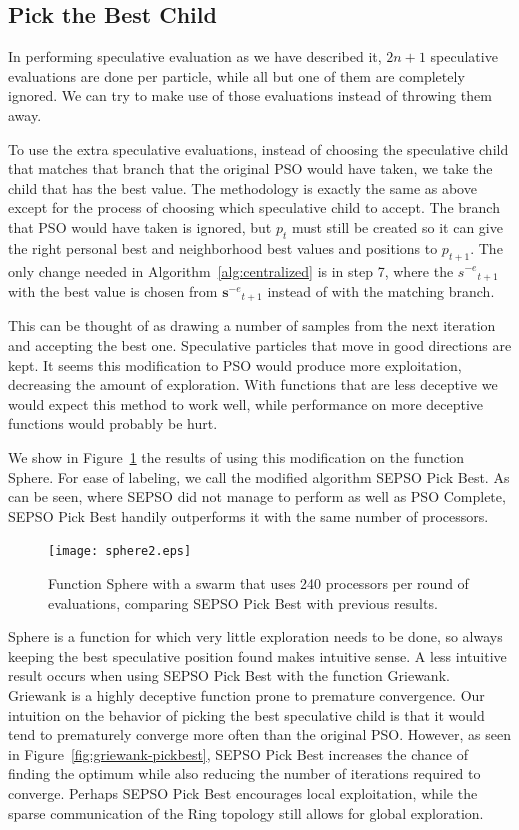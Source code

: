 \documentclass[journal,letterpaper]{IEEEtran}
\newcommand{\fig}[1]{Figure~\ref{fig:#1}}
\newcommand{\alg}[1]{Algorithm~\ref{alg:#1}}
\providecommand{\noeval}[1]{\ensuremath{#1^{-e}}}
\providecommand{\p}{\ensuremath{p}}
\providecommand{\s}{\ensuremath{s}}
\providecommand{\sset}{\ensuremath{\mathbf{s}}}
\begin{document}
\subsection{Pick the Best Child}
\label{sec:pickbest}

In performing speculative evaluation as we have described it, $2n+1$
speculative evaluations are done per particle, while all but one of them are
completely ignored.  We can try to make use of those evaluations instead of
throwing them away.  

To use the extra speculative evaluations, instead of choosing the speculative
child that matches that branch that the original PSO would have taken, we take
the child that has the best value.  The methodology is exactly the same as
above except for the process of choosing which speculative child to accept.
The branch that PSO would have taken is ignored, but $\p_t$ must still be
created so it can give the right personal best and neighborhood best values and
positions to $\p_{t+1}$.  The only change needed in \alg{centralized} is in
step 7, where the $\noeval{\s}_{t+1}$ with the best value is chosen from
$\noeval{\sset}_{t+1}$ instead of with the matching branch.

This can be thought of as drawing a number of samples from the next iteration
and accepting the best one.  Speculative particles that move in good directions
are kept.  It seems this modification to PSO would produce more exploitation,
decreasing the amount of exploration.  With functions that are less deceptive
we would expect this method to work well, while performance on more deceptive
functions would probably be hurt.

We show in \fig{sphere-pickbest} the results of using this modification on the
function Sphere.  For ease of labeling, we call the modified algorithm SEPSO
Pick Best.  As can be seen, where SEPSO did not manage to perform as well as
PSO Complete, SEPSO Pick Best handily outperforms it with the same number of
processors.

\begin{figure}
  \centering
  \texttt{[image: sphere2.eps]}
  \caption{Function Sphere with a swarm that uses 240 processors per round of
  evaluations, comparing SEPSO Pick Best with previous results.}
  \label{fig:sphere-pickbest}
\end{figure}

Sphere is a function for which very little exploration needs to be done, so
always keeping the best speculative position found makes intuitive sense.  A
less intuitive result occurs when using SEPSO Pick Best with the function
Griewank.  Griewank is a highly deceptive function prone to premature
convergence.  Our intuition on the behavior of picking the best speculative
child is that it would tend to prematurely converge more often than the
original PSO.  However, as seen in \fig{griewank-pickbest}, SEPSO Pick Best
increases the chance of finding the optimum while also reducing the number of
iterations required to converge.  Perhaps SEPSO Pick Best encourages local
exploitation, while the sparse communication of the Ring topology still allows
for global exploration.
\end{document}
